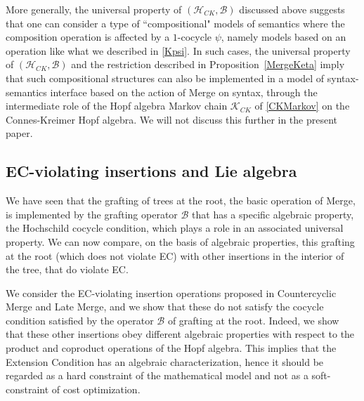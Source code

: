 \documentclass[12pt]{amsart}
\numberwithin{equation}{section}
\def\cB{{\mathcal B}}
\def\cH{{\mathcal H}}
\def\cK{{\mathcal K}}
\begin{document}
More generally, the universal property of $(\cH_{CK}, \cB)$ discussed above
suggests that one can consider a type of ``compositional" models of semantics
where the composition operation is affected by a $1$-cocycle $\psi$, namely
models based on an operation like what we described in \eqref{Kpsi}. In
such cases, the universal property of $(\cH_{CK}, \cB)$ and the restriction
described in Proposition~\ref{MergeKeta} imply that such compositional
structures can also be implemented in a model of syntax-semantics
interface based on the action of Merge on syntax, through the
intermediate role of the Hopf algebra Markov chain $\cK_{CK}$ of \eqref{CKMarkov}
on the Connes-Kreimer Hopf algebra. We will not discuss this further in the present paper.




\smallskip
\subsection{EC-violating insertions and Lie algebra}\label{ECLieSec}

We have seen that the grafting of trees at the root, the basic operation of
Merge, is implemented by the grafting operator $\cB$ that has a specific
algebraic property, the Hochschild cocycle condition, which plays a role
in an associated universal property. We can now compare, on the basis of 
algebraic properties, this grafting at the root (which does not violate EC)
with other insertions in the interior of the tree, that do violate EC. 

We consider the EC-violating insertion operations proposed
in Countercyclic Merge and Late Merge, and we show that these do not
satisfy the cocycle condition satisfied by the operator $\cB$ of grafting at the root.
Indeed, we show that these other insertions obey different algebraic properties 
with respect to the product and coproduct operations of the Hopf algebra.
This implies that the Extension Condition has an algebraic characterization,
hence it should be regarded as a hard constraint of the mathematical model
and not as a soft-constraint of cost optimization. 

\smallskip
\end{document}
